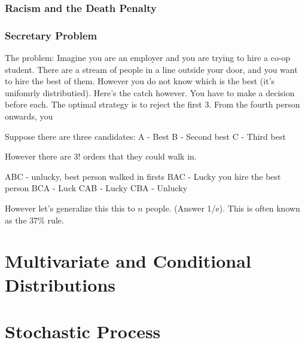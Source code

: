 \documentclass{report}
\begin{document}
\subsection{Racism and the Death Penalty}


\subsection{Secretary Problem}
The problem: Imagine you are an employer and you are trying to hire a co-op student. There are a stream of people in a line outside your door, and you want to hire the best of them. However you do not know which is the best (it's unifomrly distributied). Here's the catch however. You have to make a decision before each. The optimal strategy is to reject the first 3. From the fourth person onwards, you 


Suppose there are three candidates: 
A - Best
B - Second best
C - Third best

However there are 3! orders that they could walk in. 


ABC - unlucky, best person walked in firsts
BAC - Lucky you hire the best person
BCA - Luck 
CAB - Lucky
CBA - Unlucky



However let's generalize this this to $n$ people. (Answer 1/e). This is often known as the 37\% rule. 

\chapter{Multivariate and Conditional Distributions}

\chapter{Stochastic Process}
\end{document}
